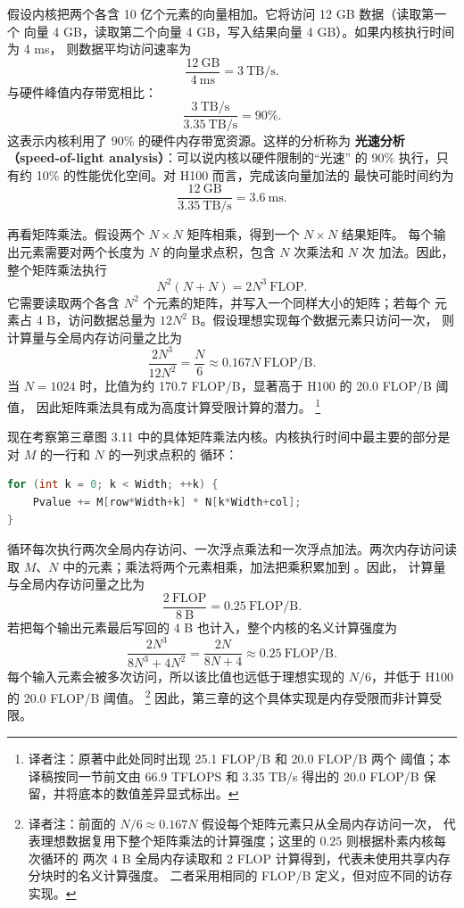 假设内核把两个各含 10 亿个元素的向量相加。它将访问 12 GB 数据（读取第一个
向量 4 GB，读取第二个向量 4 GB，写入结果向量 4 GB）。如果内核执行时间为 4 ms，
则数据平均访问速率为
\[
  \frac{12\ \mathrm{GB}}{4\ \mathrm{ms}}=3\ \mathrm{TB/s}.
\]
与硬件峰值内存带宽相比：
\[
  \frac{3\ \mathrm{TB/s}}{3.35\ \mathrm{TB/s}}=90\%.
\]
这表示内核利用了 90\% 的硬件内存带宽资源。这样的分析称为
\textbf{光速分析（speed-of-light analysis）}：可以说内核以硬件限制的“光速”
的 90\% 执行，只有约 10\% 的性能优化空间。对 H100 而言，完成该向量加法的
最快可能时间约为
\[
  \frac{12\ \mathrm{GB}}{3.35\ \mathrm{TB/s}}=3.6\ \mathrm{ms}.
\]

再看矩阵乘法。假设两个 $N\times N$ 矩阵相乘，得到一个 $N\times N$ 结果矩阵。
每个输出元素需要对两个长度为 $N$ 的向量求点积，包含 $N$ 次乘法和 $N$ 次
加法。因此，整个矩阵乘法执行
\[
  N^2(N+N)=2N^3\ \mathrm{FLOP}.
\]
它需要读取两个各含 $N^2$ 个元素的矩阵，并写入一个同样大小的矩阵；若每个
元素占 4 B，访问数据总量为 $12N^2$ B。假设理想实现每个数据元素只访问一次，
则计算量与全局内存访问量之比为
\[
  \frac{2N^3}{12N^2}
  =\frac{N}{6}
  \approx 0.167N\ \mathrm{FLOP/B}.
\]
当 $N=1024$ 时，比值为约 170.7 FLOP/B，显著高于 H100 的 20.0 FLOP/B 阈值，
因此矩阵乘法具有成为高度计算受限计算的潜力。
\footnote{译者注：原著中此处同时出现 25.1 FLOP/B 和 20.0 FLOP/B 两个
阈值；本译稿按同一节前文由 66.9 TFLOPS 和 3.35 TB/s 得出的 20.0 FLOP/B
保留，并将底本的数值差异显式标出。}

现在考察第三章图 3.11 中的具体矩阵乘法内核。内核执行时间中最主要的部分是
对 $M$ 的一行和 $N$ 的一列求点积的  循环：

\begin{lstlisting}[language=C++]
for (int k = 0; k < Width; ++k) {
    Pvalue += M[row*Width+k] * N[k*Width+col];
}
\end{lstlisting}

循环每次执行两次全局内存访问、一次浮点乘法和一次浮点加法。两次内存访问读取
$M$、$N$ 中的元素；乘法将两个元素相乘，加法把乘积累加到 。因此，
计算量与全局内存访问量之比为
\[
  \frac{2\ \mathrm{FLOP}}{8\ \mathrm{B}}=0.25\ \mathrm{FLOP/B}.
\]
若把每个输出元素最后写回的 4 B 也计入，整个内核的名义计算强度为
\[
  \frac{2N^3}{8N^3+4N^2}
  =\frac{2N}{8N+4}
  \approx 0.25\ \mathrm{FLOP/B}.
\]
每个输入元素会被多次访问，所以该比值也远低于理想实现的 $N/6$，并低于 H100
的 20.0 FLOP/B 阈值。
\footnote{译者注：前面的 $N/6\approx0.167N$ 假设每个矩阵元素只从全局内存访问一次，
代表理想数据复用下整个矩阵乘法的计算强度；这里的 $0.25$ 则根据朴素内核每次循环的
两次 4 B 全局内存读取和 2 FLOP 计算得到，代表未使用共享内存分块时的名义计算强度。
二者采用相同的 FLOP/B 定义，但对应不同的访存实现。}
因此，第三章的这个具体实现是内存受限而非计算受限。

